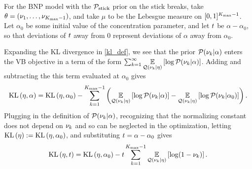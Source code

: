 \begin{ex}
%
For the BNP model with the $\mathcal{P}_{\mathrm{stick}}$ prior on the stick breaks, take $\theta = (\nu_1, \ldots,
\nu_{{K_{\mathrm{max}}}-1})$, and take $\mu$ to be the Lebesgue measure on $[0,1]^{{K_{\mathrm{max}}}-1}$.
Let $\alpha_0$ be some initial value of the concentration parameter, and
let $t$ be $\alpha - \alpha_0$, so that deviations of $t$ away from
$0$ represent deviations of $\alpha$ away from $\alpha_0$.

Expanding the KL divergence in \eqref{kl_def}, we see that the prior
$\mathcal{P}(\nu_{k} \vert \alpha)$ enters the VB objective in a term of the form
$\sum_{k=1}^\infty \underset{\mathcal{Q}(\nu_{k} \vert \eta)}{\mathbb{E}}\left[\log \mathcal{P}(\nu_{k} \vert \alpha)\right]$.
Adding and subtracting the this term evaluated at $\alpha_0$ gives
%
\begin{align*}
%
\KL{\eta, \alpha} = \KL{\eta, \alpha_0}
-\sum_{\k=1}^{\kmax - 1}
            \left(
                \expect{\q(\nuk \vert \eta)}{\log \p(\nuk \vert \alpha)} -
                \expect{\q(\nuk \vert \eta)}{\log \p(\nuk \vert \alpha_0)}
             \right).
%
\end{align*}
%
Plugging in the definition of $\mathcal{P}(\nu_{k} \vert \alpha)$, recognizing that the
normalizing constant does not depend on $\nu_{k}$ and so can be neglected in the
optimization, letting $\mathrm{KL}\left(\eta\right) := \mathrm{KL}\left(\eta, \alpha_0\right)$, and substituting $t =
\alpha - \alpha_0$ gives
%
\begin{align*}
%
\KL{\eta, \t} = \KL{\eta, \alpha_0}
-\t \sum_{\k=1}^{\kmax - 1}
    \expect{\q(\nuk \vert \eta)}{\log (1 - \nuk)}.
%
\end{align*}
%
\end{ex}



